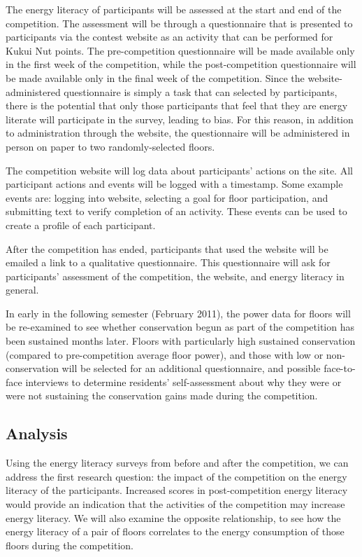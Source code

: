 The energy literacy of participants will be assessed at the start and end of the competition. The assessment will be through a questionnaire that is presented to participants via the contest website as an activity that can be performed for Kukui Nut points. The pre-competition questionnaire will be made available only in the first week of the competition, while the post-competition questionnaire will be made available only in the final week of the competition. Since the website-administered questionnaire is simply a task that can selected by participants, there is the potential that only those participants that feel that they are energy literate will participate in the survey, leading to bias. For this reason, in addition to administration through the website, the questionnaire will be administered in person on paper to two randomly-selected floors.

The competition website will log data about participants' actions on the site. All participant actions and events will be logged with a timestamp. Some example events are: logging into website, selecting a goal for floor participation, and submitting text to verify completion of an activity. These events can be used to create a profile of each participant.

After the competition has ended, participants that used the website will be emailed a link to a qualitative questionnaire. This questionnaire will ask for participants' assessment of the competition, the website, and energy literacy in general.

In early in the following semester (February 2011), the power data for floors will be re-examined to see whether conservation begun as part of the competition has been sustained months later. Floors with particularly high sustained conservation (compared to pre-competition average floor power), and those with low or non-conservation will be selected for an additional questionnaire, and possible face-to-face interviews to determine residents' self-assessment about why they were or were not sustaining the conservation gains made during the competition.

\subsection{Analysis}

Using the energy literacy surveys from before and after the competition, we can 
address the first research question: the impact of the competition on the energy literacy of the participants. Increased scores in post-competition energy literacy would provide an indication that the activities of the competition may increase energy literacy. We will also examine the opposite relationship, to see how the energy literacy of a pair of floors correlates to the energy consumption of those floors during the competition.


